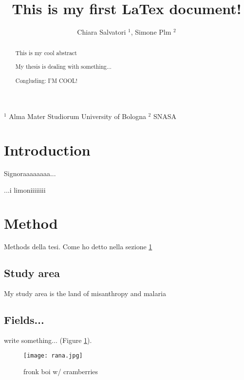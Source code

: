 \documentclass[a4paper, 12pt]{article}
\title{This is my first LaTex document!}
\author{Chiara Salvatori $^1$, Simone Plm $^2$} %
\begin{document}
\maketitle

$^1$ Alma Mater Studiorum University of Bologna
$^2$ SNASA
\begin{abstract}
This is my cool abstract

My thesis is dealing with something...

Congluding: I'M COOL!
\end{abstract}
\section{Introduction}\label{section:intro} %
Signoraaaaaaaa...

...i limoniiiiiiii
\section{Method}
Methods della tesi. Come ho detto nella sezione \ref{section:intro}
\subsection{Study area}
My study area is the land of misanthropy and malaria 
\subsection{Fields...}
write something... (Figure \ref{fig:fronk}).
\begin{figure}

    \centering
    \texttt{[image: rana.jpg]}
    \caption{fronk boi w/ cramberries}
    \label{fig:fronk}
\end{figure}
\end{document}
